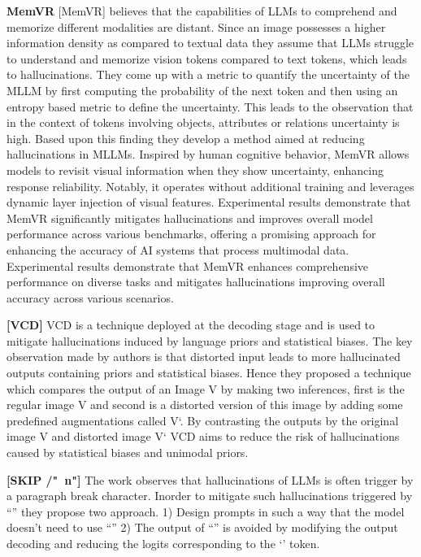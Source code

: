 \documentclass[twocolumn, 9pt]{extarticle}
\begin{document}
\textbf{MemVR} 
[MemVR] believes that the capabilities of LLMs to comprehend and memorize different modalities are distant. Since an image possesses a higher information density as compared to textual data they assume that LLMs struggle to understand and memorize vision tokens compared to text tokens, which leads to hallucinations. They come up with a metric to quantify the uncertainty of the MLLM by first computing the probability of the next token and then using an entropy based metric to define the uncertainty. This leads to the observation that in the context of tokens involving objects, attributes or relations uncertainty is high. Based upon this finding they develop a method aimed at reducing hallucinations in MLLMs. Inspired by human cognitive behavior, MemVR allows models to revisit visual information when they show uncertainty, enhancing response reliability. Notably, it operates without additional training and leverages dynamic layer injection of visual features. Experimental results demonstrate that MemVR significantly mitigates hallucinations and improves overall model performance across various benchmarks, offering a promising approach for enhancing the accuracy of AI systems that process multimodal data. Experimental results demonstrate that MemVR enhances comprehensive performance on diverse tasks and mitigates hallucinations improving overall accuracy across various scenarios. 

\textbf{[VCD]} 
VCD is a technique deployed at the decoding stage and is used to mitigate hallucinations induced by language priors and statistical biases. The key observation made by authors is that distorted input leads to more hallucinated outputs containing priors and statistical biases. Hence they proposed a technique which compares the output of an Image V by making two inferences, first is the regular image V and second is a distorted version of this image by adding some predefined augmentations called V`. By contrasting the outputs by the original image V and distorted image V` VCD aims to reduce the risk of hallucinations caused by statistical biases and unimodal priors. 


\textbf{[SKIP /"\ n"]}  
The work observes that hallucinations of LLMs is often trigger by a paragraph break character. Inorder to mitigate such hallucinations triggered by “\n” they propose two approach. 1) Design prompts in such a way that the model doesn’t need to use “\n” 2) The output of “\n” is avoided by modifying the output decoding and reducing the logits corresponding to the ‘\n’ token. 
\end{document}
